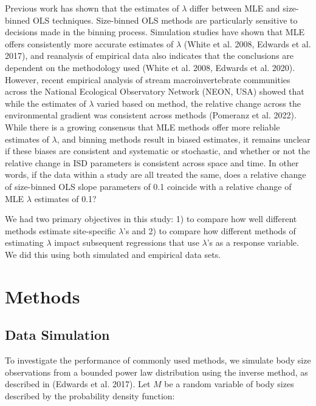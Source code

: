 \documentclass[
]{article}
\begin{document}
Previous work has shown that the estimates of \(\lambda\) differ between
MLE and size-binned OLS techniques. Size-binned OLS methods are
particularly sensitive to decisions made in the binning process.
Simulation studies have shown that MLE offers consistently more accurate
estimates of \(\lambda\) (White et al. 2008, Edwards et al. 2017), and
reanalysis of empirical data also indicates that the conclusions are
dependent on the methodology used (White et al. 2008, Edwards et al.
2020). However, recent empirical analysis of stream macroinvertebrate
communities across the National Ecological Observatory Network (NEON,
USA) showed that while the estimates of \(\lambda\) varied based on
method, the relative change across the environmental gradient was
consistent across methods (Pomeranz et al. 2022). While there is a
growing consensus that MLE methods offer more reliable estimates of
\(\lambda\), and binning methods result in biased estimates, it remains
unclear if these biases are consistent and systematic or stochastic, and
whether or not the relative change in ISD parameters is consistent
across space and time. In other words, if the data within a study are
all treated the same, does a relative change of size-binned OLS slope
parameters of 0.1 coincide with a relative change of MLE \(\lambda\)
estimates of 0.1?

We had two primary objectives in this study: 1) to compare how well
different methods estimate site-specific \(\lambda\)'s and 2) to compare
how different methods of estimating \(\lambda\) impact subsequent
regressions that use \(\lambda\)'s as a response variable. We did this
using both simulated and empirical data sets.

\hypertarget{methods}{%
\section{Methods}\label{methods}}

\hypertarget{data-simulation}{%
\subsection{Data Simulation}\label{data-simulation}}

To investigate the performance of commonly used methods, we simulate
body size observations from a bounded power law distribution using the
inverse method, as described in (Edwards et al. 2017). Let \(M\) be a
random variable of body sizes described by the probability density
function:
\end{document}
